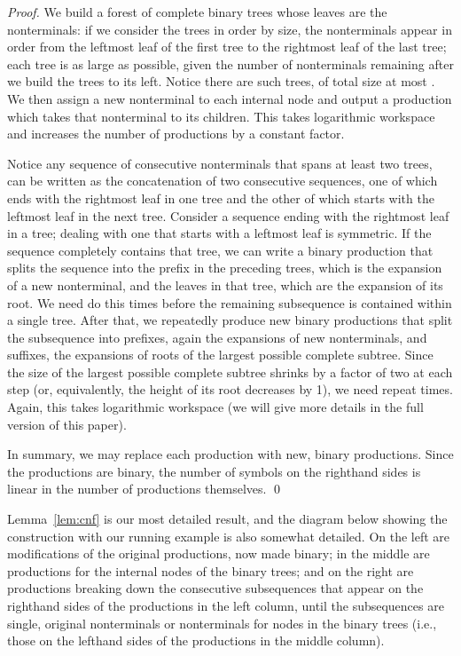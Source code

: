 \documentclass[runningheads]{llncs}
\begin{document}
\begin{proof}
We build a forest of complete binary trees whose leaves are the nonterminals: if we consider the trees in order by size, the nonterminals appear in order from the leftmost leaf of the first tree to the rightmost leaf of the last tree; each tree is as large as possible, given the number of nonterminals remaining after we build the trees to its left.  Notice there are  such trees, of total size at most .  We then assign a new nonterminal to each internal node and output a production which takes that nonterminal to its children.  This takes logarithmic workspace and increases the number of productions by a constant factor.

Notice any sequence of consecutive nonterminals that spans at least two trees, can be written as the concatenation of two consecutive sequences, one of which ends with the rightmost leaf in one tree and the other of which starts with the leftmost leaf in the next tree.  Consider a sequence ending with the rightmost leaf in a tree; dealing with one that starts with a leftmost leaf is symmetric.  If the sequence completely contains that tree, we can write a binary production that splits the sequence into the prefix in the preceding trees, which is the expansion of a new nonterminal, and the leaves in that tree, which are the expansion of its root.  We need do this  times before the remaining subsequence is contained within a single tree.  After that, we repeatedly produce new binary productions that split the subsequence into prefixes, again the expansions of new nonterminals, and suffixes, the expansions of roots of the largest possible complete subtree.  Since the size of the largest possible complete subtree shrinks by a factor of two at each step (or, equivalently, the height of its root decreases by 1), we need repeat  times.  Again, this takes logarithmic workspace (we will give more details in the full version of this paper).

In summary, we may replace each production with  new, binary productions.  Since the productions are binary, the number of symbols on the righthand sides is linear in the number of productions themselves. \qed
\end{proof}

Lemma~\ref{lem:cnf} is our most detailed result, and the diagram below showing the construction with our running example is also somewhat detailed.  On the left are modifications of the original productions, now made binary; in the middle are productions for the internal nodes of the binary trees; and on the right are productions breaking down the consecutive subsequences that appear on the righthand sides of the productions in the left column, until the subsequences are single, original nonterminals or nonterminals for nodes in the binary trees (i.e., those on the lefthand sides of the productions in the middle column).
\end{document}
